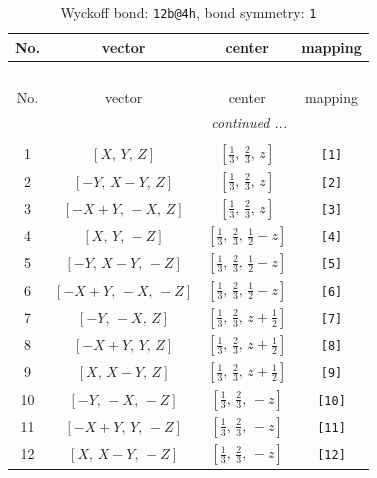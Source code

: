 \documentclass[fleqn,8pt]{jsarticle}
\begin{document}
\begin{longtable}{cccc}
\caption{Wyckoff bond: {\tt 12b@4h}, bond symmetry: {\tt 1}}
 \\
 \hline \hline
No. & vector & center & mapping \\ \hline \endfirsthead

\multicolumn{3}{l}{\tablename\ \thetable{}} \\
 \hline \hline
No. & vector & center & mapping \\ \hline \endhead

 \hline \hline
\multicolumn{3}{r}{\footnotesize\it continued ...} \\ \endfoot

 \hline \hline
\multicolumn{3}{r}{} \\ \endlastfoot

1 & $\left[ X,\, Y,\, Z \right]$ & $\left[ \frac{1}{3},\, \frac{2}{3},\, z \right]$ & {\tt [1]} \\ \hline
2 & $\left[ - Y,\, X - Y,\, Z \right]$ & $\left[ \frac{1}{3},\, \frac{2}{3},\, z \right]$ & {\tt [2]} \\ \hline
3 & $\left[ - X + Y,\, - X,\, Z \right]$ & $\left[ \frac{1}{3},\, \frac{2}{3},\, z \right]$ & {\tt [3]} \\ \hline
4 & $\left[ X,\, Y,\, - Z \right]$ & $\left[ \frac{1}{3},\, \frac{2}{3},\, \frac{1}{2} - z \right]$ & {\tt [4]} \\ \hline
5 & $\left[ - Y,\, X - Y,\, - Z \right]$ & $\left[ \frac{1}{3},\, \frac{2}{3},\, \frac{1}{2} - z \right]$ & {\tt [5]} \\ \hline
6 & $\left[ - X + Y,\, - X,\, - Z \right]$ & $\left[ \frac{1}{3},\, \frac{2}{3},\, \frac{1}{2} - z \right]$ & {\tt [6]} \\ \hline
7 & $\left[ - Y,\, - X,\, Z \right]$ & $\left[ \frac{1}{3},\, \frac{2}{3},\, z + \frac{1}{2} \right]$ & {\tt [7]} \\ \hline
8 & $\left[ - X + Y,\, Y,\, Z \right]$ & $\left[ \frac{1}{3},\, \frac{2}{3},\, z + \frac{1}{2} \right]$ & {\tt [8]} \\ \hline
9 & $\left[ X,\, X - Y,\, Z \right]$ & $\left[ \frac{1}{3},\, \frac{2}{3},\, z + \frac{1}{2} \right]$ & {\tt [9]} \\ \hline
10 & $\left[ - Y,\, - X,\, - Z \right]$ & $\left[ \frac{1}{3},\, \frac{2}{3},\, - z \right]$ & {\tt [10]} \\ \hline
11 & $\left[ - X + Y,\, Y,\, - Z \right]$ & $\left[ \frac{1}{3},\, \frac{2}{3},\, - z \right]$ & {\tt [11]} \\ \hline
12 & $\left[ X,\, X - Y,\, - Z \right]$ & $\left[ \frac{1}{3},\, \frac{2}{3},\, - z \right]$ & {\tt [12]} \\
\end{longtable}
\end{document}
